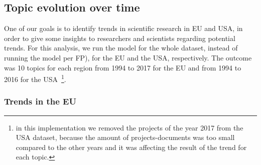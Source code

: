 \documentclass[12pt]{report}
\begin{document}
\vfill
\subsection{Topic evolution over time}

One of our goals is to identify trends in scientific research in EU
and USA, in order to give some insights to researchers and scientists
regarding potential trends. For this analysis, we run the model for
the whole dataset, instead of running the model per FP), for the EU
and the USA, respectively. The outcome was 10 topics for each region
from 1994 to 2017 for the EU and from 1994 to 2016 for the
USA~\footnote{in this implementation we removed the projects of the
  year 2017 from the USA dataset, because the amount of
  projects-documents was too small compared to the other years and it
  was affecting the result of the trend for each topic.}.

\subsubsection{Trends in the EU}
\end{document}
